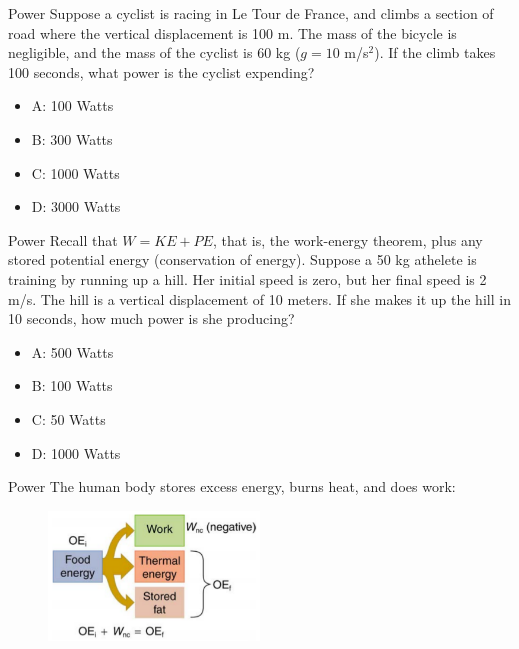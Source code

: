 \documentclass{beamer}
\begin{document}
\begin{frame}{Power}
Suppose a cyclist is racing in Le Tour de France, and climbs a section of road where the vertical displacement is 100 m.  The mass of the bicycle is negligible, and the mass of the cyclist is 60 kg ($g = 10$ m/s$^2$).  If the climb takes 100 seconds, what power is the cyclist expending?
\begin{itemize}
\item A: 100 Watts
\item B: 300 Watts
\item C: 1000 Watts
\item D: 3000 Watts
\end{itemize}
\end{frame}

\begin{frame}{Power}
Recall that $W = KE + PE$, that is, the work-energy theorem, plus any stored potential energy (conservation of energy).  Suppose a 50 kg athelete is training by running up a hill.  Her initial speed is zero, but her final speed is 2 m/s.  The hill is a vertical displacement of 10 meters.  If she makes it up the hill in 10 seconds, how much power is she producing?
\begin{itemize}
\item A: 500 Watts
\item B: 100 Watts
\item C: 50 Watts
\item D: 1000 Watts
\end{itemize}
\end{frame}

\begin{frame}{Power}
The human body stores excess energy, burns heat, and does work:
\begin{figure}
\centering
\includegraphics[width=0.5\textwidth]{figures/body.png}
\end{figure}
\end{frame}
\end{document}
